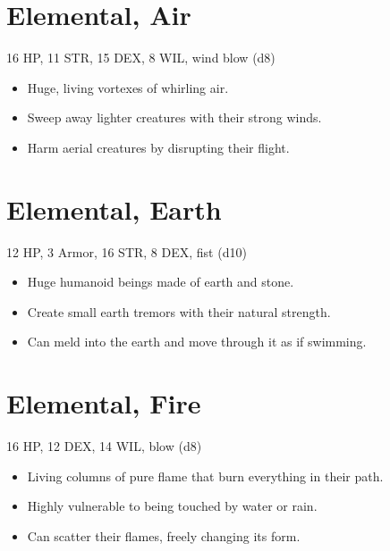 \documentclass[
  10pt,
  american,
]{article}
\begin{document}
\hypertarget{elemental-air}{%
\section{Elemental, Air}\label{elemental-air}}

16 HP, 11 STR, 15 DEX, 8 WIL, wind blow (d8)

\begin{samepage}
\begin{itemize}
\setlength\itemsep{-.5em}
\item Huge, living vortexes of whirling air.
\item Sweep away lighter creatures with their strong winds.
\item Harm aerial creatures by disrupting their flight.
\end{itemize}
\end{samepage}

\hypertarget{elemental-earth}{%
\section{Elemental, Earth}\label{elemental-earth}}

12 HP, 3 Armor, 16 STR, 8 DEX, fist (d10)

\begin{samepage}
\begin{itemize}
\setlength\itemsep{-.5em}
\item Huge humanoid beings made of earth and stone.
\item Create small earth tremors with their natural strength.
\item Can meld into the earth and move through it as if swimming.
\end{itemize}
\end{samepage}

\hypertarget{elemental-fire}{%
\section{Elemental, Fire}\label{elemental-fire}}

16 HP, 12 DEX, 14 WIL, blow (d8)

\begin{samepage}
\begin{itemize}
\setlength\itemsep{-.5em}
\item Living columns of pure flame that burn everything in their path.
\item Highly vulnerable to being touched by water or rain.
\item Can scatter their flames, freely changing its form.
\end{itemize}
\end{samepage}
\end{document}
